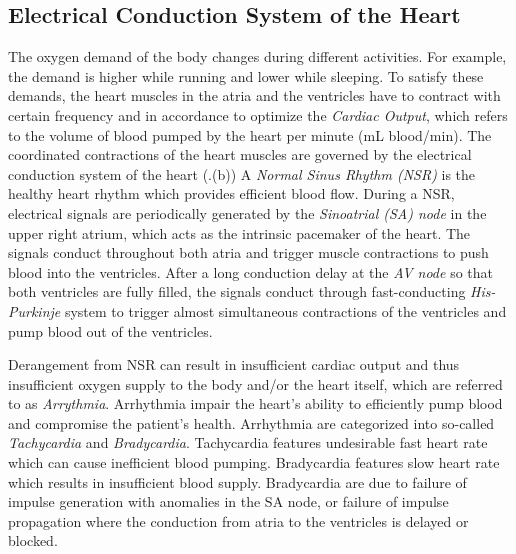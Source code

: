 \subsection{Electrical Conduction System of the Heart}
The oxygen demand of the body changes during different activities. For example, the demand is higher while running and lower while sleeping. To satisfy these demands, the heart muscles in the atria and the ventricles have to contract with certain frequency and in accordance to optimize the \emph{Cardiac Output}, which refers to the volume of blood pumped by the heart per minute (mL blood/min). The coordinated contractions of the heart muscles are governed by the electrical conduction system of the heart (.(b)) A \emph{Normal Sinus Rhythm (NSR)} is the healthy heart rhythm which provides efficient blood flow. During a NSR, electrical signals are periodically generated by the \emph{Sinoatrial (SA) node} in the upper right atrium, which acts as the intrinsic pacemaker of the heart. The signals conduct throughout both atria and trigger muscle contractions to push blood into the ventricles. After a long conduction delay at the \emph{AV node} so that both ventricles are fully filled, the signals conduct through fast-conducting \emph{His-Purkinje} system to trigger almost simultaneous contractions of the ventricles and pump blood out of the ventricles. 

Derangement from NSR can result in insufficient cardiac output and thus insufficient oxygen supply to the body and/or the heart itself, which are referred to as \emph{Arrythmia}. Arrhythmia impair the heart's ability to efficiently pump blood and compromise the patient's health. 
Arrhythmia are categorized into so-called \emph{Tachycardia} and \emph{Bradycardia}. Tachycardia features undesirable fast heart rate which can cause inefficient blood pumping. Bradycardia features slow heart rate which results in insufficient blood supply. Bradycardia are due to failure of impulse generation with anomalies in the SA node, or failure of impulse propagation where the conduction from atria to the ventricles is delayed or blocked. 
